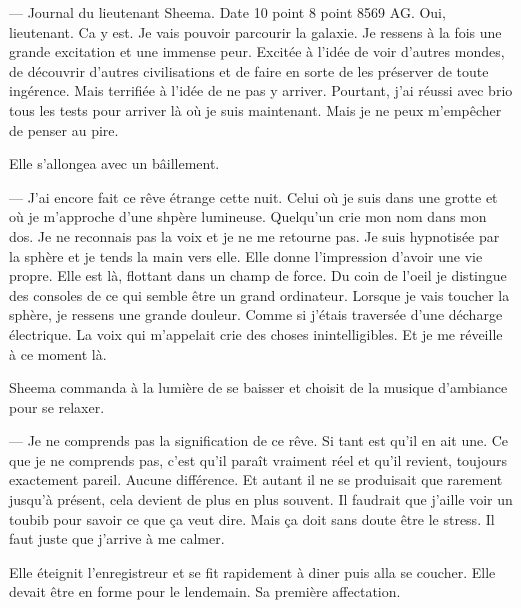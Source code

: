 --- Journal du lieutenant Sheema. Date 10 point 8 point 8569 AG. Oui,
lieutenant. Ca y est. Je vais pouvoir parcourir la galaxie. Je ressens à la fois
une grande excitation et une immense peur. Excitée à l'idée de voir d'autres
mondes, de découvrir d'autres civilisations et de faire en sorte de les
préserver de toute ingérence. Mais terrifiée à l'idée de ne pas y arriver.
Pourtant, j'ai réussi avec brio tous les tests pour arriver là où je suis
maintenant. Mais je ne peux m'empêcher de penser au pire.

Elle s'allongea avec un bâillement.

--- J'ai encore fait ce rêve étrange cette nuit. Celui où je suis dans une
grotte et où je m'approche d'une shpère lumineuse. Quelqu'un crie mon nom dans
mon dos. Je ne reconnais pas la voix et je ne me retourne pas. Je suis
hypnotisée par la sphère et je tends la main vers elle. Elle donne l'impression
d'avoir une vie propre. Elle est là, flottant dans un champ de force. Du coin de
l'oeil je distingue des consoles de ce qui semble être un grand ordinateur.
Lorsque je vais toucher la sphère, je ressens une grande douleur. Comme si
j'étais traversée d'une décharge électrique. La voix qui m'appelait crie des
choses inintelligibles. Et je me réveille à ce moment là.

Sheema commanda à la lumière de se baisser et choisit de la musique d'ambiance
pour se relaxer.

--- Je ne comprends pas la signification de ce rêve. Si tant est qu'il en ait
une. Ce que je ne comprends pas, c'est qu'il paraît vraiment réel et qu'il
revient, toujours exactement pareil. Aucune différence. Et autant il ne se
produisait que rarement jusqu'à présent, cela devient de plus en plus souvent.
Il faudrait que j'aille voir un toubib pour savoir ce que ça veut dire. Mais ça
doit sans doute être le stress. Il faut juste que j'arrive à me calmer.

Elle éteignit l'enregistreur et se fit rapidement à diner puis alla se coucher.
Elle devait être en forme pour le lendemain. Sa première affectation.



